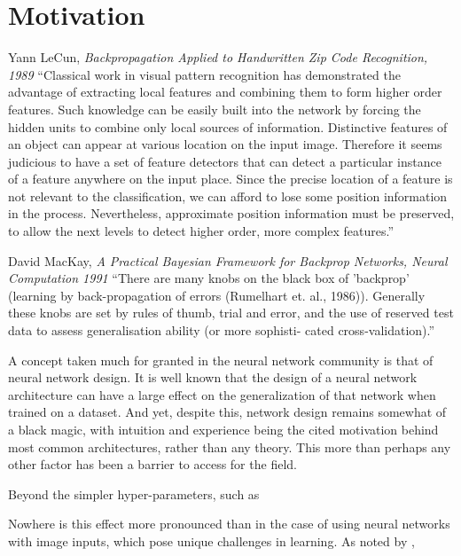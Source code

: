 \documentclass[thesis]{subfiles}
\begin{document}
	\chapter{Motivation}
	\label{motivation}
	\begin{chapquote}{Yann LeCun, \textit{Backpropagation Applied to Handwritten Zip Code Recognition, 1989}}
		``Classical work in visual pattern recognition has demonstrated the advantage of extracting local features and combining them to form higher order features. Such knowledge can be easily built into the network by forcing the hidden units to combine only local sources of information. Distinctive features of an object can appear at various location on the input image. Therefore it seems judicious to have a set of feature detectors that can detect a particular instance of a feature anywhere on the input place. Since the precise location of a feature is not relevant to the classification, we can afford to lose some position information in the process. Nevertheless, approximate position information must be preserved, to allow the next levels to detect higher order, more complex features.''
	\end{chapquote}
	
	\begin{chapquote}{David MacKay, \textit{A Practical Bayesian Framework for Backprop Networks, Neural Computation 1991}}
	``There are many knobs on the black box of 'backprop' (learning by back-propagation of
	errors (Rumelhart et. al., 1986)). Generally these knobs are set by rules of thumb, trial and
	error, and the use of reserved test data to assess generalisation ability (or more sophisti-
	cated cross-validation).''
	\end{chapquote}
	
	A concept taken much for granted in the neural network community is that of neural network design. It is well known that the design of a neural network architecture can have a large effect on the generalization of that network when trained on a dataset. And yet, despite this, network design remains somewhat of a black magic, with intuition and experience being the cited motivation behind most common architectures, rather than any theory. This more than perhaps any other factor has been a barrier to access for the field.
	
	Beyond the simpler hyper-parameters, such as 
	
	Nowhere is this effect more pronounced than in the case of using neural networks with image inputs, which pose unique challenges in learning. As noted by \cite{Fuk80}, 
	
\end{document}
